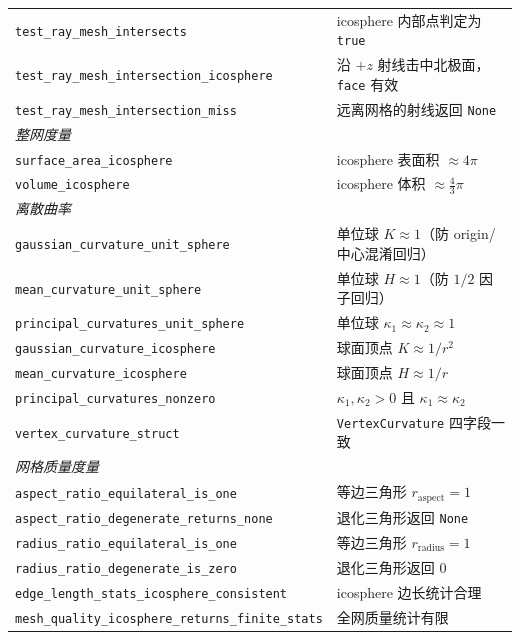 \documentclass[11pt,a4paper]{article}
\begin{document}
\begin{center}
\begin{tabular}{@{}ll@{}}
  \texttt{test\_ray\_mesh\_intersects}              & icosphere 内部点判定为 \texttt{true} \\
  \texttt{test\_ray\_mesh\_intersection\_icosphere} & 沿 $+z$ 射线击中北极面，\texttt{face} 有效 \\
  \texttt{test\_ray\_mesh\_intersection\_miss}      & 远离网格的射线返回 \texttt{None} \\
  \midrule
  \multicolumn{2}{l}{\textit{整网度量}} \\
  \texttt{surface\_area\_icosphere}                 & icosphere 表面积 $\approx 4\pi$ \\
  \texttt{volume\_icosphere}                        & icosphere 体积 $\approx \frac{4}{3}\pi$ \\
  \midrule
  \multicolumn{2}{l}{\textit{离散曲率}} \\
  \texttt{gaussian\_curvature\_unit\_sphere}         & 单位球 $K \approx 1$（防 origin/中心混淆回归） \\
  \texttt{mean\_curvature\_unit\_sphere}             & 单位球 $H \approx 1$（防 $1/2$ 因子回归） \\
  \texttt{principal\_curvatures\_unit\_sphere}       & 单位球 $\kappa_1 \approx \kappa_2 \approx 1$ \\
  \texttt{gaussian\_curvature\_icosphere}           & 球面顶点 $K \approx 1/r^2$ \\
  \texttt{mean\_curvature\_icosphere}               & 球面顶点 $H \approx 1/r$ \\
  \texttt{principal\_curvatures\_nonzero}           & $\kappa_1, \kappa_2 > 0$ 且 $\kappa_1 \approx \kappa_2$ \\
  \texttt{vertex\_curvature\_struct}                & \texttt{VertexCurvature} 四字段一致 \\
  \midrule
  \multicolumn{2}{l}{\textit{网格质量度量}} \\
  \texttt{aspect\_ratio\_equilateral\_is\_one}      & 等边三角形 $r_{\text{aspect}} = 1$ \\
  \texttt{aspect\_ratio\_degenerate\_returns\_none} & 退化三角形返回 \texttt{None} \\
  \texttt{radius\_ratio\_equilateral\_is\_one}      & 等边三角形 $r_{\text{radius}} = 1$ \\
  \texttt{radius\_ratio\_degenerate\_is\_zero}      & 退化三角形返回 0 \\
  \texttt{edge\_length\_stats\_icosphere\_consistent} & icosphere 边长统计合理 \\
  \texttt{mesh\_quality\_icosphere\_returns\_finite\_stats} & 全网质量统计有限 \\

\end{tabular}
\end{center}
\end{document}

